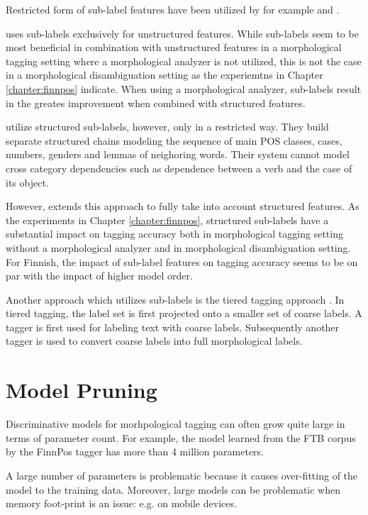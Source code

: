 Restricted form of sub-label features have been utilized by for
example \cite{Muller2013} and \cite{Smith2005}.
 
\cite{Muller2013} uses sub-labels exclusively for unstructured
features. While sub-labels seem to be most beneficial in combination
with unstructured features in a morphological tagging setting where a
morphological analyzer is not utilized, this is not the case in a
morphological disambiguation setting as the experiemtns in Chapter
\ref{chapter:finnpos} indicate. When using a morphological analyzer,
sub-labels result in the greates improvement when combined with
structured features.

\cite{Smith2015} utilize structured sub-labels, however, only in a
restricted way. They build separate structured chains modeling the
sequence of main POS classes, cases, numbers, genders and lemmas of
neighoring words. Their system cannot model cross category
dependencies such as dependence between a verb and the case of its
object.

However, \cite{Silfvererg2014} extends this approach to fully take
into account structured features. As the experiments in Chapter
\ref{chapter:finnpos}, structured sub-labels have a substantial impact
on tagging accuracy both in morphological tagging setting without a
morphological analyzer and in morphological disambiguation
setting. For Finnish, the impact of sub-label features on tagging
accuracy seems to be on par with the impact of higher model order.

Another approach which utilizes sub-labels is the tiered tagging
approach \citep{Tufis1999,Ceausu2006}. In tiered tagging, the label
set is first projected onto a smaller set of coarse labels. A tagger
is first used for labeling text with coarse labels. Subsequently
another tagger is used to convert coarse labels into full
morphological labels.

\section{Model Pruning}\label{sec:pruning}

Discriminative models for morhpological tagging can often grow quite
large in terms of parameter count. For example, the model learned from
the FTB corpus by the FinnPos tagger has more than 4 million
parameters.

A large number of parameters is problematic because it causes
over-fitting of the model to the training data. Moreover, large models
can be problematic when memory foot-print is an issue: e.g. on mobile
devices.

